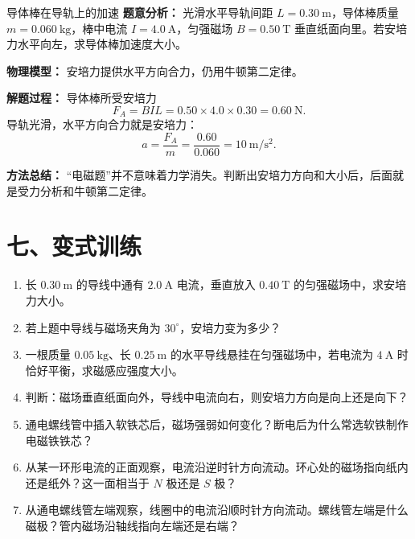 \begin{examplebox}{导体棒在导轨上的加速}
\textbf{题意分析：} 光滑水平导轨间距 $L=0.30\ \mathrm{m}$，导体棒质量 $m=0.060\ \mathrm{kg}$，棒中电流 $I=4.0\ \mathrm{A}$，匀强磁场 $B=0.50\ \mathrm{T}$ 垂直纸面向里。若安培力水平向左，求导体棒加速度大小。

\textbf{物理模型：} 安培力提供水平方向合力，仍用牛顿第二定律。

\begin{center}

\end{center}

\textbf{解题过程：}
导体棒所受安培力
\[
F_A=BIL=0.50\times4.0\times0.30=0.60\ \mathrm{N}.
\]
导轨光滑，水平方向合力就是安培力：
\[
a=\frac{F_A}{m}=\frac{0.60}{0.060}=10\ \mathrm{m/s^2}.
\]

\textbf{方法总结：} “电磁题”并不意味着力学消失。判断出安培力方向和大小后，后面就是受力分析和牛顿第二定律。
\end{examplebox}

\section*{七、变式训练}

\begin{enumerate}
  \item 长 $0.30\ \mathrm{m}$ 的导线中通有 $2.0\ \mathrm{A}$ 电流，垂直放入 $0.40\ \mathrm{T}$ 的匀强磁场中，求安培力大小。
  \item 若上题中导线与磁场夹角为 $30^\circ$，安培力变为多少？
  \item 一根质量 $0.05\ \mathrm{kg}$、长 $0.25\ \mathrm{m}$ 的水平导线悬挂在匀强磁场中，若电流为 $4\ \mathrm{A}$ 时恰好平衡，求磁感应强度大小。
  \begin{center}
  
  \end{center}
  \item 判断：磁场垂直纸面向外，导线中电流向右，则安培力方向是向上还是向下？
  \begin{center}
  
  \end{center}
  \item 通电螺线管中插入软铁芯后，磁场强弱如何变化？断电后为什么常选软铁制作电磁铁铁芯？
  \item 从某一环形电流的正面观察，电流沿逆时针方向流动。环心处的磁场指向纸内还是纸外？这一面相当于 $N$ 极还是 $S$ 极？
  \item 从通电螺线管左端观察，线圈中的电流沿顺时针方向流动。螺线管左端是什么磁极？管内磁场沿轴线指向左端还是右端？
\end{enumerate}

